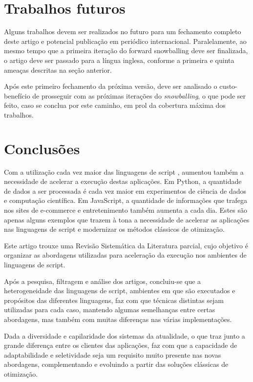 \documentclass[sigconf]{acmart}
\begin{document}
\section{Trabalhos futuros}
Alguns trabalhos devem ser realizados no futuro para um fechamento completo deste artigo e potencial publicação em periódico internacional. Paralelamente, ao mesmo tempo que a primeira iteração do forward snowballing deve ser finalizada, o artigo deve ser passado para a língua inglesa, conforme a primeira e quinta ameaças descritas na seção anterior.

Após este primeiro fechamento da próxima versão, deve ser analisado o custo-benefício de prosseguir com as próximas iterações do \textit{snowballing}, o que pode ser feito, caso se conclua por este caminho, em prol da cobertura máxima dos trabalhos.


\section{Conclusões}
Com a utilização cada vez maior das linguagens de script , aumentou também a necessidade de acelerar a execução destas aplicações. Em Python, a quantidade de dados a ser processada é cada vez maior em experimentos de ciência de dados e computação científica. Em JavaScript, a quantidade de informações que trafega nos sites de e-commerce e entretenimento também aumenta a cada dia. Estes são apenas alguns exemplos que trazem à tona a necessidade de acelerar as aplicações nas linguagens de script e modernizar os métodos clássicos de otimização.

Este artigo trouxe uma Revisão Sistemática da Literatura parcial, cujo objetivo é organizar as abordagens utilizadas para aceleração da execução nos ambientes de linguagens de script.

Após a pesquisa, filtragem e análise dos artigos, concluiu-se que a heterogeneidade das linguagens de script, ambientes em que são executados e propósitos das diferentes linguagens, faz com que técnicas distintas sejam utilizadas para cada caso, mantendo algumas semelhanças entre certas abordagens, mas também com muitas diferenças nas várias implementações.

Dada a diversidade e capilaridade dos sistemas da atualidade, o que traz junto a grande diferença entre os clientes das aplicações, faz com que a capacidade de adaptabilidade e seletividade seja um requisito muito presente nas novas abordagens, complementando e evoluindo a partir das soluções clássicas de otimização.
\end{document}
